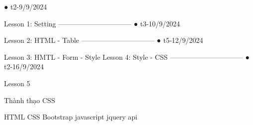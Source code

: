 ● t2-9/9/2024

Lesson 1: Setting
--------------------------------   
    ● t3-10/9/2024

Lesson 2: HTML - Table
--------------------------------
    ● t5-12/9/2024

Lesson 3: HMTL - Form - Style
Lesson 4: Style - CSS
--------------------------------
    ● t2-16/9/2024

Lesson 5



Thành thạo CSS

HTML
CSS
Bootstrap 
javascript
jquery
api